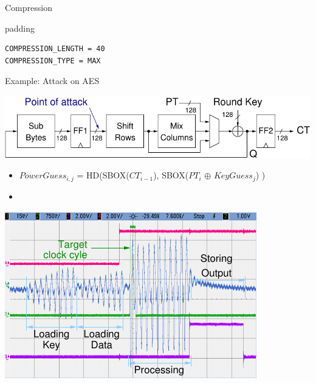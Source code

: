 \documentclass[final]{beamer}
\begin{document}
\begin{frame}[fragile]{}
\begin{columns}[t]
\begin{column}{.31\linewidth}
\begin{block}{Compression}
\begin{minipage}[t]{0.49\linewidth}
          \begin{center}
            \begin{beamercolorbox}[rounded=true]{padding}%
               \footnotesize%
              \begin{lstlisting}
COMPRESSION_LENGTH = 40
COMPRESSION_TYPE = MAX
              \end{lstlisting}
            \end{beamercolorbox}
          \end{center}
        \end{minipage}
       \end{block}
       \begin{block}{Example: Attack on AES}
         \begin{center}
           \includegraphics[width=0.9\linewidth]{../figures/aes128}
         \end{center}
         \begin{itemize}
		 \item {\small $PowerGuess_{i, j}$ = HD(SBOX($CT_{i-1}$), SBOX($PT_{i}$ $\oplus$ $KeyGuess_{j}$) )}
		 \item
         \end{itemize}
	 \begin{minipage}[t]{0.49\linewidth}
			\includegraphics[width=0.80\linewidth]{../figures/oscilloscope-all-4ch} 
	 

\end{minipage}
\end{block}
\end{column}
\end{columns}
\end{frame}
\end{document}
